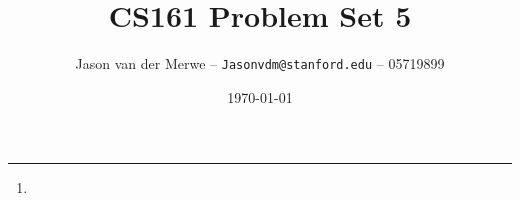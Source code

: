 \documentclass[12pt]{article}
\title{CS161 Problem Set 5}
\author{Jason van der Merwe -- \texttt{Jasonvdm@stanford.edu} -- 05719899}
\date{\today}
\begin{document}
\maketitle

\vspace{-0.3in}
\rule{\linewidth}{0.4pt}



\begin{enumerate}
    \item 
    

\end{enumerate}
\end{document}
